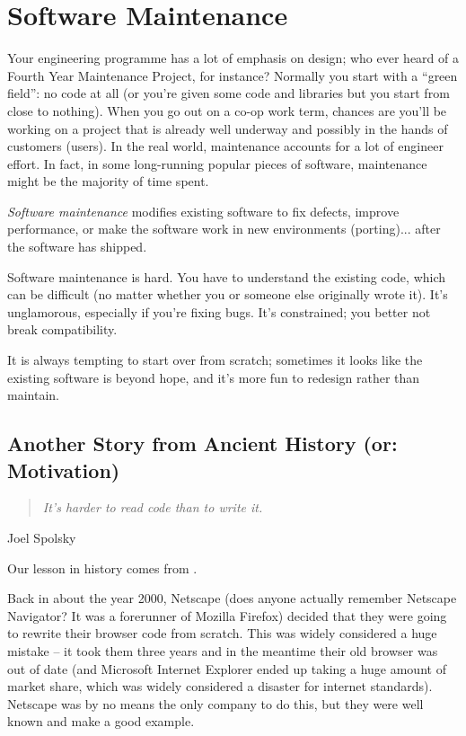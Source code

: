 \section*{Software Maintenance}
Your engineering programme has a lot of emphasis on design; who ever
heard of a Fourth Year Maintenance Project, for instance? Normally you start with a ``green field'': no code at all (or you're given some code and libraries but you start from close to nothing). When you go out on a co-op work term, chances are you'll be working on a project that is already well underway and possibly in the hands of customers (users). In the real world, maintenance accounts for a lot of engineer effort. In fact, in some long-running popular pieces of software, maintenance might be the majority of time spent.

\emph{Software maintenance} modifies existing software to fix defects,
improve performance, or make the software work in new environments
(porting)... after the software has shipped.

Software maintenance is hard. You have to understand the existing code,
which can be difficult (no matter whether you or someone else originally
wrote it). It's unglamorous, especially if you're fixing bugs. It's 
constrained; you better not break compatibility.

It is always tempting to start over from scratch; sometimes it looks
like the existing software is beyond hope, and it's more fun to redesign
rather than maintain.

\subsection*{Another Story from Ancient History (or: Motivation)}
\begin{quote}
	\emph{It's harder to read code than to write it.}
\end{quote}
	\hfill Joel Spolsky
	
Our lesson in history comes from \cite{spolsky:drw}.

Back in about the year 2000, Netscape (does anyone actually remember Netscape Navigator? It was a forerunner of Mozilla Firefox) decided that they were going to rewrite their browser code from scratch. This was widely considered a huge mistake -- it took them three years and in the meantime their old browser was out of date (and Microsoft Internet Explorer ended up taking a huge amount of market share, which was widely considered a disaster for internet standards). Netscape was by no means the only company to do this, but they were well known and make a good example.


